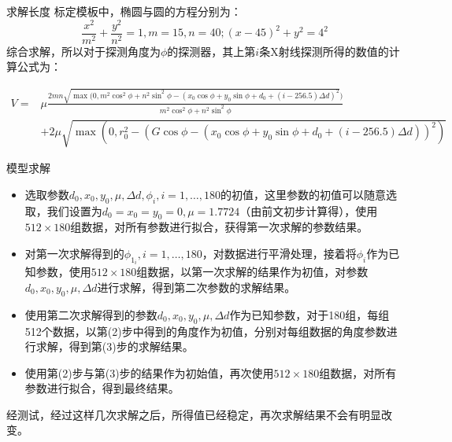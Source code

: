 \documentclass{beamer}
\begin{document}
  \begin{frame}{求解长度}
    标定模板中，椭圆与圆的方程分别为：
    \[\frac{x^2}{m^2} + \frac{y^2}{n^2} = 1,m = 15,n = 40;(x - 45)^2 + y^2 = 4^2\]
    综合求解，所以对于探测角度为\(\phi\)的探测器，其上第\(i\)条X射线探测所得的数值的计算公式为：
    \begin{tiny}
      \begin{align*}\label{va}
      V = & \mu\frac{2mn\sqrt{\max(0,m^2\cos^2\phi + n^2\sin^2\phi - (x_0\cos\phi + y_0\sin\phi + d_0 +  (i - 256.5)\Delta d)^2})}{ m^2\cos^2\phi + n^2\sin^2\phi} \\
        & + 2\mu\sqrt{\max(0,r_0^2 - (G\cos\phi - (x_0\cos\phi + y_0\sin\phi + d_0 +  (i - 256.5)\Delta d))^2)}
      \end{align*}
    \end{tiny}
  \end{frame}

  \begin{frame}{模型求解}
    \begin{itemize}
      \item 选取参数\(d_0,x_0,y_0,\mu,\Delta d,\phi_i,i=1,\ldots,180\)的初值，这里参数的初值可以随意选取，我们设置为\(d_0 = x_0 = y_0 =  0,\mu = 1.7724\)（由前文初步计算得），使用\(512\times 180\)组数据，对所有参数进行拟合，获得第一次求解的参数结果。
      \item 对第一次求解得到的\(\phi_{1_i},i=1,\ldots,180\)，对数据进行平滑处理，接着将\(\phi_i\)作为已知参数，使用\(512\times 180\)组数据，以第一次求解的结果作为初值，对参数\(d_0,x_0,y_0,\mu,\Delta d\)进行求解，得到第二次参数的求解结果。
    \end{itemize}
    \end{frame}

    \begin{frame}
    \begin{itemize}
      \item 使用第二次求解得到的参数\(d_0,x_0,y_0,\mu,\Delta d\)作为已知参数，对于180组，每组512个数据，以第(2)步中得到的角度作为初值，分别对每组数据的角度参数进行求解，得到第(3)步的求解结果。
      \item 使用第(2)步与第(3)步的结果作为初始值，再次使用\(512\times 180\)组数据，对所有参数进行拟合，得到最终结果。
      \end{itemize}
      经测试，经过这样几次求解之后，所得值已经稳定，再次求解结果不会有明显改变。
  \end{frame}
\end{document}
